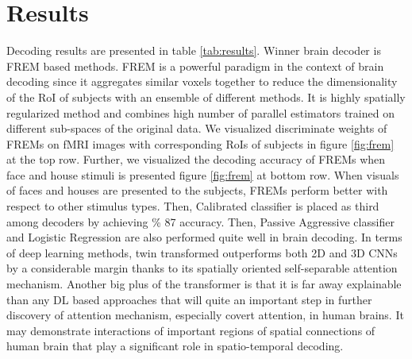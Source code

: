 \documentclass[10pt, twocolumn, letterpaper]{article}
\begin{document}
\section{Results}
Decoding results are presented in table \ref{tab:results}. Winner brain decoder is FREM based methods. FREM is a powerful paradigm in the context of brain decoding since it aggregates similar voxels together to reduce the dimensionality of the RoI of subjects with an ensemble of different methods. It is highly spatially regularized method and combines high number of parallel estimators trained on different sub-spaces of the original data. We visualized discriminate weights of FREMs on fMRI images with corresponding RoIs of subjects in figure \ref{fig:frem} at the top row. Further, we visualized the decoding accuracy of FREMs when face and house stimuli is presented figure \ref{fig:frem} at bottom row. When visuals of faces and houses are presented to the subjects, FREMs perform better with respect to other stimulus types. Then, Calibrated classifier is placed as third among decoders by achieving \% 87 accuracy. Then, Passive Aggressive classifier and Logistic Regression are also performed quite well in brain decoding. In terms of deep learning methods, twin transformed outperforms both 2D and 3D CNNs by a considerable margin thanks to its spatially oriented self-separable attention mechanism. Another big plus of the transformer is that it is far away explainable than any DL based approaches that will quite an important step in further discovery of attention mechanism, especially covert attention, in human brains. It may demonstrate interactions of important regions of spatial connections of human brain that play a significant role in spatio-temporal decoding. 
\end{document}
